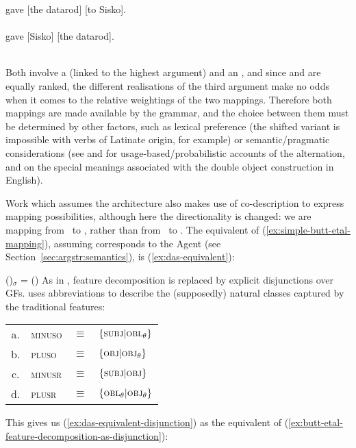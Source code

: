 \documentclass[output=paper]{langscibook}
\begin{document}
\begin{exe}
\ex \gll [Garak] gave {[the datarod]} {[to Sisko]}.\\
\SUBJ{} {} \OBJ{} \\

\ex \gll [Garak] gave [Sisko] {[the datarod]}.\\
\SUBJ{} {} \OBJ{} \\
\end{exe}
%
Both involve a \SUBJ (linked to the highest argument) and an \OBJ, and since
\OBJTHETA and \OBLTHETA are equally ranked, the different realisations of the
third argument make no odds when it comes to the relative weightings of the two
mappings. Therefore both mappings are made available by the grammar, and the
choice between them must be determined by other factors, such as lexical
preference (the shifted variant is impossible with verbs of Latinate origin, for
example) or semantic\slash pragmatic considerations (see \citealt{Bresnan2007}
and \citealt{Bresnan07predicting} for usage-based\slash probabilistic accounts
of the alternation, and \citealt[ch.~6]{goldberg1995constructions} on the
special meanings associated with the double object construction in English).


Work which assumes the \citet{AsudGior12} architecture also makes use of
co-description to express mapping possibilities, although here the
directionality is changed: we are mapping from \fstruc\ to \sstruc, rather than
from \astruc\ to \fstruc. The equivalent of (\ref{ex:simple-butt-etal-mapping}),
assuming  corresponds to the Agent (see Section~\ref{sec:argstr:semantics}),
is (\ref{ex:das-equivalent}):

\ea\label{ex:das-equivalent} (\UP \SUBJ)$_\sigma$ = (\UPS {}) \z
%
As in \citet{butt1997architecture}, feature decomposition is replaced by
explicit disjunctions over GFs. \citet[299]{findlay2017mapping} uses
abbreviations to describe the (supposedly) natural classes captured by the
traditional features:

\ea\label{ex:feature-disjunctions}
\begin{tabular}[t]{clcl}
  a. & \textsc{minuso} & $\equiv$ &{$\{\textsc{subj}{} \vert \mbox{\textsc{obl}$_{\theta}$}{}\}$}\\
  b. & \textsc{pluso} & $\equiv$ & $\{\textsc{obj}{} \vert \mbox{\textsc{obj}$_{\theta}$}{} \}$\\
  c. & \textsc{minusr} & $\equiv$& {$\{\textsc{subj}{} \vert \textsc{obj}{}\}$}\\
  d. & \textsc{plusr}& $\equiv$ & {$\{\mbox{\textsc{obl}$_{\theta}$}{} \vert \mbox{\textsc{obj}$_{\theta}$}{}\}$}
\end{tabular}
\z
%
This gives us (\ref{ex:das-equivalent-disjunction}) as the equivalent of
(\ref{ex:butt-etal-feature-decomposition-as-disjunction}):
\end{document}

